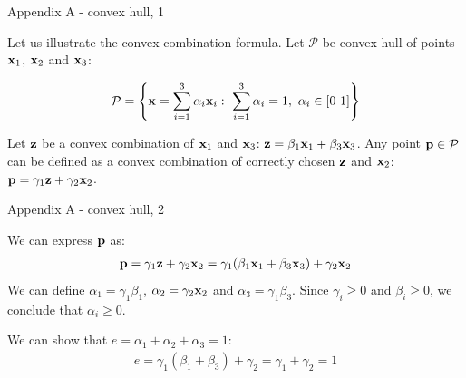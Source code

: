 \documentclass{beamer}
\begin{document}
\begin{frame}{Appendix A - convex hull, 1}
	\begin{flushleft}
		
		
		\begin{figure}[.45\textwidth]
			\centering
			\resizebox{.65\textwidth}{!}
			{}
		\end{figure}
		
		Let us illustrate the convex combination formula. 
		Let $\mathcal{P}$ be convex hull of points $\mathbf{x}_1$, $\mathbf{x}_2$ and $\mathbf{x}_3$:
		
		
		\begin{equation}
			\mathcal{P} = \left \{  \mathbf{x} = \sum_{i=1}^{3} \alpha_i\mathbf{x}_i: \   \sum_{i=1}^{3} \alpha_i = 1, \  \alpha_i  \in [0 \ 1] \right \}
		\end{equation}
		
		Let $\mathbf{z}$ be a convex combination of $\mathbf{x}_1$ and $\mathbf{x}_3$: $\mathbf{z} = \beta_1 \mathbf{x}_1 + \beta_3 \mathbf{x}_3 $. Any point $\mathbf{p} \in \mathcal{P}$ can be defined as a convex combination of correctly chosen $\mathbf{z}$ and $\mathbf{x}_2$: $\mathbf{p} = \gamma_1 \mathbf{z} + \gamma_2 \mathbf{x}_2$.
		
	\end{flushleft}
\end{frame}



\begin{frame}{Appendix A - convex hull, 2}
	\begin{flushleft}
		
		
		
		\begin{figure}[.45\textwidth]
			\centering
			\resizebox{.45\textwidth}{!}
			{}
		\end{figure}
		
		We can express $\mathbf{p}$ as:
		\begin{align}
			\mathbf{p} =  \gamma_1 \mathbf{z} + \gamma_2 \mathbf{x}_2 
			           = \gamma_1 (\beta_1 \mathbf{x}_1 + \beta_3 \mathbf{x}_3 )+ \gamma_2 \mathbf{x}_2
		\end{align}
		We can define $\alpha_1 = \gamma_1 \beta_1$, $\alpha_2= \gamma_2 \mathbf{x}_2$ and $\alpha_3 = \gamma_1 \beta_3$. Since $\gamma_i \geq 0$ and $\beta_i \geq 0$, we conclude that $\alpha_i \geq 0$.
		
		\bigskip
		
		We can show that $e = \alpha_1 + \alpha_2+\alpha_3 = 1$:
		\begin{align}
			e =  \gamma_1(\beta_1 +\beta_3) + \gamma_2 = \gamma_1 + \gamma_2 = 1
		\end{align}
		
		
	\end{flushleft}
\end{frame}
\end{document}
